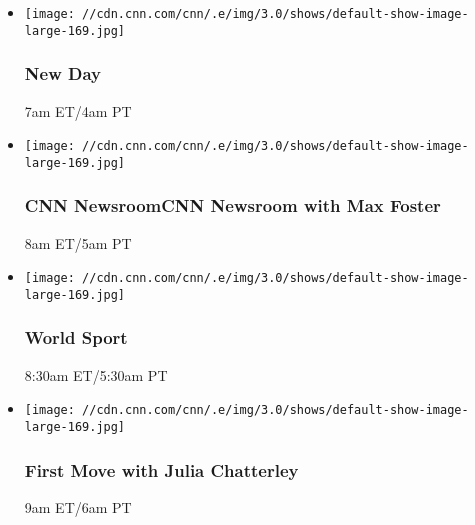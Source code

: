 \begin{itemize}
\item
  \texttt{[image: //cdn.cnn.com/cnn/.e/img/3.0/shows/default-show-image-large-169.jpg]}

  \hypertarget{new-day-7}{%
  \subsubsection{New Day}\label{new-day-7}}

  7am ET/4am PT
\end{itemize}

\begin{itemize}
\item
  \texttt{[image: //cdn.cnn.com/cnn/.e/img/3.0/shows/default-show-image-large-169.jpg]}

  \hypertarget{cnn-newsroomcnn-newsroom-with-max-foster--3}{%
  \subsubsection{CNN NewsroomCNN Newsroom with Max Foster
  }\label{cnn-newsroomcnn-newsroom-with-max-foster--3}}

  8am ET/5am PT
\end{itemize}

\begin{itemize}
\item
  \texttt{[image: //cdn.cnn.com/cnn/.e/img/3.0/shows/default-show-image-large-169.jpg]}

  \hypertarget{world-sport-15}{%
  \subsubsection{World Sport}\label{world-sport-15}}

  8:30am ET/5:30am PT
\end{itemize}

\begin{itemize}
\item
  \texttt{[image: //cdn.cnn.com/cnn/.e/img/3.0/shows/default-show-image-large-169.jpg]}

  \hypertarget{first-move-with-julia-chatterley-3}{%
  \subsubsection{First Move with Julia
  Chatterley}\label{first-move-with-julia-chatterley-3}}

  9am ET/6am PT
\end{itemize}

